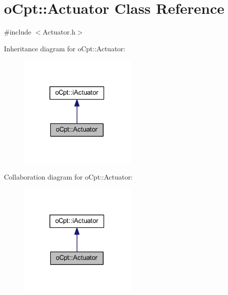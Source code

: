 \hypertarget{classo_cpt_1_1_actuator}{}\section{o\+Cpt\+:\+:Actuator Class Reference}
\label{classo_cpt_1_1_actuator}


{\ttfamily \#include $<$Actuator.\+h$>$}



Inheritance diagram for o\+Cpt\+:\+:Actuator\+:\nopagebreak
\begin{figure}[H]
\begin{center}
\leavevmode
\includegraphics[width=162pt]{classo_cpt_1_1_actuator__inherit__graph}
\end{center}
\end{figure}


Collaboration diagram for o\+Cpt\+:\+:Actuator\+:\nopagebreak
\begin{figure}[H]
\begin{center}
\leavevmode
\includegraphics[width=162pt]{classo_cpt_1_1_actuator__coll__graph}
\end{center}
\end{figure}
